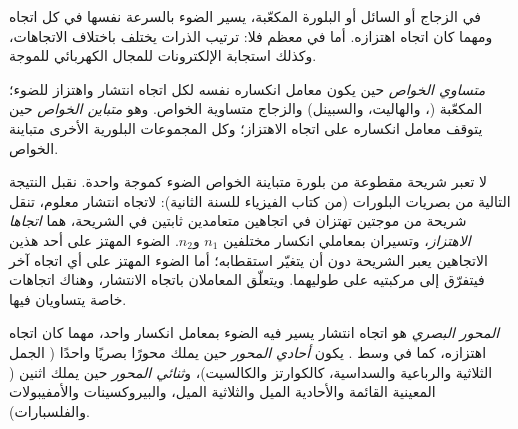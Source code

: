 في الزجاج أو السائل أو البلورة المكعّبة، يسير الضوء بالسرعة نفسها في كل اتجاه ومهما كان اتجاه اهتزازه. أما في معظم  فلا: ترتيب الذرات يختلف باختلاف الاتجاهات، وكذلك استجابة الإلكترونات للمجال الكهربائي للموجة.

\begin{definition}\label{def:b1:optical-mineralogy:anisotropic}
 \emph{متساوي الخواص} حين يكون معامل انكساره نفسه لكل اتجاه انتشار واهتزاز للضوء؛  المكعّبة (، والهاليت، والسبينل) والزجاج متساوية الخواص. وهو \emph{متباين الخواص} حين يتوقف معامل انكساره على اتجاه الاهتزاز؛ وكل  المجموعات البلورية الأخرى متباينة الخواص.
\end{definition}

لا تعبر شريحة مقطوعة من بلورة متباينة الخواص الضوء كموجة واحدة. نقبل النتيجة التالية من بصريات البلورات (من كتاب الفيزياء للسنة الثانية): لاتجاه انتشار معلوم، تنقل شريحة من  موجتين تهتزان في اتجاهين متعامدين ثابتين في الشريحة، هما \emph{اتجاها الاهتزاز}، وتسيران بمعاملي انكسار مختلفين $n_1$ و$n_2$. الضوء المهتز على أحد هذين الاتجاهين يعبر الشريحة دون أن يتغيّر استقطابه؛ أما الضوء المهتز على أي اتجاه آخر فيتفرّق إلى مركبتيه على طوليهما. ويتعلّق المعاملان باتجاه الانتشار، وهناك اتجاهات خاصة يتساويان فيها.

\begin{definition}\label{def:b1:optical-mineralogy:optic-axis}
\emph{المحور البصري}  هو اتجاه انتشار يسير فيه الضوء بمعامل انكسار واحد، مهما كان اتجاه اهتزازه، كما في وسط . يكون  \emph{أحادي المحور} حين يملك محورًا بصريًا واحدًا ( الجمل الثلاثية والرباعية والسداسية، كالكوارتز والكالسيت)، و\emph{ثنائي المحور} حين يملك اثنين ( المعينية القائمة والأحادية الميل والثلاثية الميل،  والبيروكسينات والأمفيبولات  والفلسبارات).
\end{definition}

